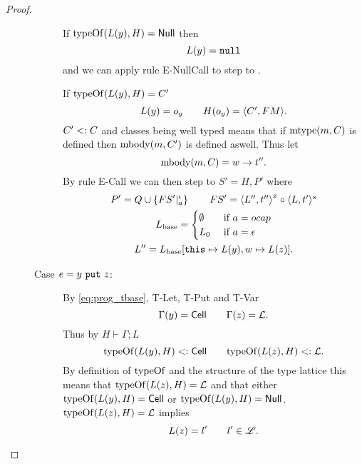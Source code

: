 \begin{proof}
\begin{description}
\begin{description}
          If $\mbox{$\mathrm{typeOf}$}(L(y), H) = \mbox{$\mathsf{Null}$}$ then
          \begin{equation*}
            L(y) = \mbox{\mdseries\texttt{null}}
          \end{equation*}
          and we can apply rule {\sc E-NullCall} to step to \Error.
          \contradiction

          If $\mbox{$\mathrm{typeOf}$}(L(y), H) = C'$
          \begin{equation*}
            L(y) = o_y \quad\quad H(o_y) = \mbox{$\langle C', FM \rangle$}.
          \end{equation*}
          $C' <: C$ and classes being well typed means that if $\mbox{$\mathrm{mtype}$}(m, C)$
          is defined then $\mbox{$\mathrm{mbody}$}(m, C')$ is defined aswell. Thus let
          \begin{equation*}
            \mbox{$\mathrm{mbody}$}(m, C) = w \to t''.
          \end{equation*}
          By rule {\sc E-Call} we can then step to $S' = H, P'$ where
          \begin{equation*}
            \begin{gathered}
              P' = Q \cup \left\{FS'|_a^\iota \right\} \quad\quad FS' = \mbox{$\langle L'',
              t'' \rangle$}^x \circ \mbox{$\langle L, t' \rangle^s$} \\
              L_{\text{base}} =
              \begin{cases}
                \emptyset & \text{ if } a = \mbox{$ocap$} \\
                L_0       & \text{ if } a = \mbox{$\epsilon$}
              \end{cases} \\
              L'' = L_{\text{base}}[\mbox{\mdseries\texttt{this}} \mapsto L(y), w \mapsto L(z)].
            \end{gathered}
          \end{equation*}
          \contradiction

        \item[Case $e = \mbox{\mdseries$y$~\texttt{put}~$z$}$:]
          By \eqref{eq:prog_tbase}, {\sc T-Let}, {\sc T-Put} and {\sc T-Var}
          \begin{equation*}
            \Gamma(y) = \mbox{$\mathsf{Cell}$} \quad\quad \Gamma(z) = \mbox{$\mathcal{L}$}.
          \end{equation*}
          Thus by $H \vdash \Gamma; L$
          \begin{equation*}
            \mbox{$\mathrm{typeOf}$}(L(y), H) <: \mbox{$\mathsf{Cell}$} \quad\quad \mbox{$\mathrm{typeOf}$}(L(z), H) <:
            \mbox{$\mathcal{L}$}.
          \end{equation*}
          By definition of $\mbox{$\mathrm{typeOf}$}$ and the structure of the type lattice this
          means that $\mbox{$\mathrm{typeOf}$}(L(z), H) = \mbox{$\mathcal{L}$}$ and that either
          $\mbox{$\mathrm{typeOf}$}(L(y), H) = \mbox{$\mathsf{Cell}$}$ or $\mbox{$\mathrm{typeOf}$}(L(y), H) = \mbox{$\mathsf{Null}$}$. \\
          $\mbox{$\mathrm{typeOf}$}(L(z), H) = \mbox{$\mathcal{L}$}$ implies
          \begin{equation*}
            L(z) = l' \quad\quad l' \in \mbox{$\mathscr{L}$}.
          \end{equation*}


\end{description}
\end{description}
\end{proof}
